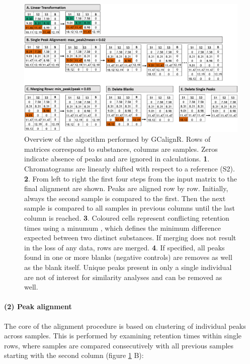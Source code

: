 \newpage

\begin{figure}[htbp]
  \centering
  \includegraphics[width=13cm]{figures/algorithm}
  \caption{Overview of the algorithm performed by GCalignR. Rows of matrices correspond to substances, columns are samples. Zeros indicate absence of peaks and are ignored in calculations. \textbf{1}. Chromatograms are linearly shifted with respect to a reference (S2). \textbf{2}. From left to right the first four steps from the input matrix to the final alignment are shown. Peaks are aligned row by row. Initially, always the second sample is compared to the first. Then the next sample is compared to all samples in previous columns until the last column is reached. \textbf{3}. Coloured cells represent conflicting retention times using a minumum , which defines the minimum difference expected between two distinct substances. If merging does not result in the loss of any data, rows are merged. \textbf{4}.  If specified, all peaks found in one or more blanks (negative controls) are removes as well as the blank itself. Unique peaks present in only a single individual are not of interest for similarity analyses and can be removed as well.}
  \label{figure:algorithm}
\end{figure}

\paragraph{(2) Peak alignment}\label{peak-alignment}

The core of the alignment procedure is based on clustering of individual
peaks across samples. This is performed by examining retention times
within single rows, where samples are compared consecutively with all
previous samples starting with the second column (figure
\ref{figure:algorithm} B):\par

